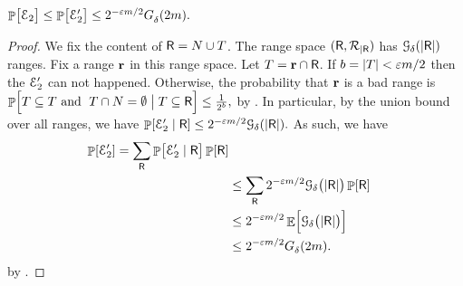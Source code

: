 \begin{claim}
    \begin{math}
        \Prob{\bigl. \Event_2} \leq \Prob{ \bigl. \Event_2'}%
        \leq%
        2^{-\eps m /2} \fGrowX{2m}.
    \end{math}
\end{claim}
\begin{proof}
    We fix the content of $\mathsf{R} = N \cup T$. The range space
    $(\mathsf{R}, {\mathcal{R}}_{|\mathsf{R}})$ has
    $\Growth{\Dim}{ \cardin{\Sample}}$ ranges. Fix a range $\mathbf{r}$ in
    this range space. Let $T = \mathbf{r} \cap \mathsf{R}$.  If
    $b = \left| { T } \right| < {\varepsilon} m /2$ then the $\EuScript{E}_2'$ can not
    happened. Otherwise, the probability that $\mathbf{r}$ is a bad range
    is
    \begin{math}
        \Prob{ \Bigl. \SetB \subseteq T \text{ and }\; \SetB \cap N =
           \emptyset \bigm\vert{ \SetB \subseteq \Sample}} \leq
        \frac{1}{2^b},
    \end{math}
    by . In particular, by the union bound over
    all ranges, we have
    \begin{math}
        \Prob{\Event_2' \mid \Sample} %
        \leq 2^{-\eps m /2}  \Growth{\Dim}{ \cardin{\Sample}}.
    \end{math}
    As such, we have
    \begin{align*}
      \Prob{\Event_2'}%
      =%
      \sum_{\Sample}       
      \Prob{\bigl. \Event_2' \mid \Sample} \Prob{\Sample}
      \\&
      \leq%
      \sum_{\Sample}
      2^{-\eps m /2}  \Growth{\Dim}{\bigl. \cardin{\Sample}}
      \Prob{\Sample}
      \\&
      \leq%
      2^{-\eps m /2}
      \Ex{\Bigl.
      \Growth{\Dim}{\bigl. \cardin{\Sample}} }
      \\&
      \leq%
      2^{-\eps m /2}
      \fGrowX{2m}.
    \end{align*}
    by .
\end{proof}


